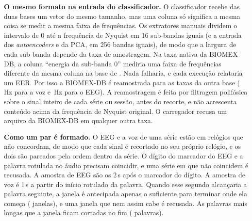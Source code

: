 		\par \textbf{O mesmo formato na entrada do classificador.} O classificador recebe das duas bases um vetor do mesmo tamanho, mas uma coluna só significa a mesma coisa se medir a mesma faixa de frequências. Os extratores manuais dividem o intervalo de 0 até a frequência de Nyquist em 16 sub-bandas iguais (e a entrada dos \textit{autoencoders} e da \ac{PCA}, em 256 bandas iguais), de modo que a largura de cada sub-banda depende da taxa de amostragem. Na taxa nativa da BIOMEX-DB, a coluna ``energia da sub-banda 0'' mediria uma faixa de frequências diferente da mesma coluna na base de . Nada falharia, e cada execução relataria um \ac{EER}. Por isso a BIOMEX-DB é reamostrada para as taxas da outra base (\,Hz para a voz e \,Hz para o \ac{EEG}). A reamostragem é feita por filtragem polifásica sobre o sinal inteiro de cada série ou sessão, antes do recorte, e não acrescenta conteúdo acima da frequência de Nyquist original. O carregador recusa um arquivo da BIOMEX-DB em qualquer outra taxa.

		\par \textbf{Como um par é formado.} O \ac{EEG} e a voz de uma série estão em relógios que não concordam, de modo que cada sinal é recortado no seu próprio relógio, e os dois são pareados pela ordem dentro da série. O dígito do marcador do \ac{EEG} e a palavra rotulada no áudio precisam coincidir, e uma série em que não coincidem é recusada. A amostra de \ac{EEG} são os 2\,s após o marcador do dígito. A amostra de voz é 1\,s a partir do início rotulado da palavra. Quando esse segundo alcançaria a palavra seguinte, a janela é antecipada apenas o suficiente para terminar onde ela começa ( janelas), e uma janela que nem assim cabe é recusada. As palavras mais longas que a janela ficam cortadas no fim ( palavras).

